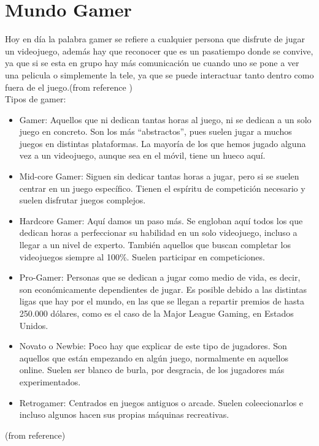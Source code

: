 \documentclass{bmcart}
\begin{document}
\section*{Mundo Gamer}
Hoy en día la palabra gamer se refiere a cualquier persona que disfrute de jugar un videojuego, además hay que reconocer que es un pasatiempo donde se convive, ya que si se esta en grupo hay más comunicación ue cuando uno se pone a ver una pelicula o simplemente la tele, ya que se puede interactuar tanto dentro como fuera de el juego.(from reference \cite{gamer})\\
Tipos de gamer:
\begin{itemize} 
	\item Gamer: Aquellos que ni dedican tantas horas al juego, ni se dedican a un solo juego en concreto. Son los más “abstractos”, pues suelen jugar a muchos juegos en distintas plataformas. La mayoría de los que hemos jugado alguna vez a un videojuego, aunque sea en el móvil, tiene un hueco aquí.
	\item Mid-core Gamer: Siguen sin dedicar tantas horas a jugar, pero si se suelen centrar en un juego específico. Tienen el espíritu de competición necesario y suelen disfrutar juegos complejos.
	\item Hardcore Gamer: Aquí damos un paso más. Se engloban aquí todos los que dedican horas a perfeccionar su habilidad en un solo videojuego, incluso a llegar a un nivel de experto. También aquellos que buscan completar los videojuegos siempre al 100{\%}. Suelen participar en competiciones.
	\item Pro-Gamer: Personas que se dedican a jugar como medio de vida, es decir, son económicamente dependientes de jugar. Es posible debido a las distintas ligas que hay por el mundo, en las que se llegan a repartir premios de hasta 250.000 dólares, como es el caso de la Major League Gaming, en Estados Unidos.
	\item Novato o Newbie: Poco hay que explicar de este tipo de jugadores. Son aquellos que están empezando en algún juego, normalmente en aquellos online. Suelen ser blanco de burla, por desgracia, de los jugadores más experimentados.
	\item Retrogamer: Centrados en juegos antiguos o arcade. Suelen coleecionarlos e incluso algunos hacen sus propias máquinas recreativas.
\end{itemize} (from reference\cite{tiposgamer})
\end{document}
